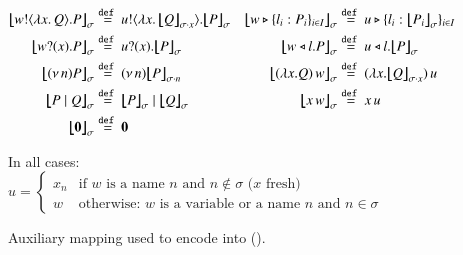 \begin{figure}[t!]
	\begin{align*}
		\auxmapp{\bout{w}{\abs{x}{Q}} P}{{}}{\sigma} & \defeq \bout{u}{\abs{x}{\auxmapp{Q}{{}}{{\sigma \cat x}}}} \auxmapp{P}{{}}{\sigma}
		&
		\auxmapp{\bbra{w}{l_i:P_i}_{i \in I}}{{}}{\sigma} & \defeq \bbra{u}{l_i:\auxmapp{P_i}{{}}{\sigma}}_{i \in I}		
		\\
		\auxmapp{\binp{w}{x} P}{{}}{\sigma} & \defeq \binp{u}{x} \auxmapp{P}{{}}{\sigma} 
		&
		\auxmapp{\bsel{w}{l} P}{{}}{\sigma} & \defeq \bsel{u}{l} \auxmapp{P}{{}}{\sigma} 
		\\
		\auxmapp{\news{n} P}{{}}{\sigma} & \defeq \news{n} \auxmapp{P}{{}}{{\sigma \cat n}}
		&
		\auxmapp{\appl{(\lambda x.Q)}{w}}{{}}{\sigma}  & \defeq \appl{(\lambda x.\auxmapp{Q}{{}}{{\sigma \cat x}})}{u}
		\\
		\auxmapp{P \Par Q}{{}}{\sigma} & \defeq \auxmapp{P}{{}}{\sigma} \Par \auxmapp{Q}{{}}{\sigma} 
		&
		\auxmapp{\appl{x}{w}}{{}}{\sigma} & \defeq \appl{x}{u}
		\\
		\auxmapp{\inact}{{}}{\sigma}  & \defeq  \inact	
		& 
\end{align*}
\begin{center}
	{In all cases: $u = 
	\begin{cases} 
	x_n & \text{if $w$ is a name $n$ and  $n \not\in \sigma$ ($x$ fresh)}
	\\
	w & \text{otherwise: $w$ is a variable or a name $n$ and $n \in \sigma$} 
	 	\end{cases}$}
\end{center}
\caption{\label{f:auxmap} Auxiliary mapping used to encode \HOp into \HO ().}
\end{figure}
